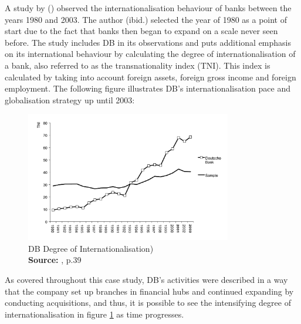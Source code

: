 \documentclass[11pt,a4paper]{article}
\newcommand*{\captionsource}[2]{%
  \caption[{#1}]{%
    #1%
    \\\hspace{\linewidth}%
    \textbf{Source:} #2%
  }%
}
\begin{document}
{{A study by \citeauthor{slagerInternationalizationBanksStrategic2005} (\citeyear{slagerInternationalizationBanksStrategic2005}) observed the internationalisation behaviour of banks between the years 1980 and 2003. The author (ibid.) selected the year of 1980 as a point of start due to the fact that banks then began to expand on a scale never seen before. The study includes DB in its observations and puts additional emphasis on its international behaviour by calculating the degree of internationalisation of a bank, also referred to as the transnationality index (TNI). This index is calculated by taking into account foreign assets, foreign gross income and foreign employment. The following figure illustrates DB's internationalisation pace and globalisation strategy up until 2003:

  \vspace{5mm}
\begin{figure}[H]
	\centering
  \includegraphics[width=90mm]{figures/fig_db_internationalisation}
  \vspace{5mm}
    \captionsetup{justification=centering,margin=2cm}
      \captionsource{DB Degree of Internationalisation)}{\cite{slagerInternationalizationBanksStrategic2005}, p.39}
	\label{fig:db_international}
\end{figure}

As covered throughout this case study, DB's activities were described in a way that the company set up branches in financial hubs and continued expanding by conducting acquisitions, and thus, it is possible to see the intensifying degree of internationalisation in figure \ref{fig:db_international} as time progresses.

\vspace{-2mm}
}}
\end{document}
